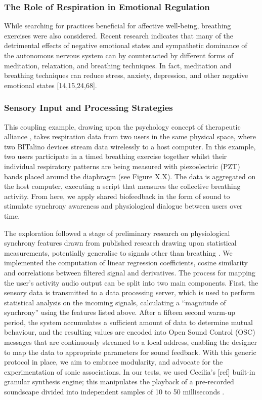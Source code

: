 \subsubsection{The Role of Respiration in Emotional Regulation}

While searching for practices beneficial for affective well-being, breathing exercises were also considered. Recent research indicates that many of the detrimental effects of negative emotional states and sympathetic dominance of the autonomous nervous system can by counteracted by different forms of meditation, relaxation, and breathing techniques. In fact, meditation and breathing techniques can reduce stress, anxiety, depression, and other negative emotional states [14,15,24,68].

\subsubsection{Sensory Input and Processing Strategies}

This coupling example, drawing upon the psychology concept of therapeutic alliance \cite{koole_synchrony_2016}, takes respiration data from two users in the same physical space, where two BITalino devices stream data wirelessly to a host computer. In this example, two users participate in a timed breathing exercise together whilst their individual respiratory patterns are being measured with piezoelectric (PZT) bands placed around the diaphragm (see Figure X.X). The data is aggregated on the host computer, executing a script that measures the collective breathing activity. From here, we apply shared biofeedback in the form of sound to stimulate synchrony awareness and physiological dialogue between users over time.

The exploration followed a stage of preliminary research on physiological synchrony features drawn from published research drawing upon statistical measurements, potentially generalise to signals other than breathing \cite{zamm_endogenous_2016}. We implemented the computation of linear regression coefficients, cosine similarity and correlations between filtered signal and derivatives. The process for mapping the user’s activity audio output can be split into two main components. First, the sensory data is transmitted to a data processing server, which is used to perform statistical analysis on the incoming signals, calculating a “magnitude of synchrony” using the features listed above. After a fifteen second warm-up period, the system accumulates a sufficient amount of data to determine mutual behaviour, and the resulting values are encoded into Open Sound Control (OSC) messages that are continuously streamed to a local address, enabling the designer to map the data to appropriate parameters for sound feedback. With this generic protocol in place, we aim to embrace modularity, and advocate for the experimentation of sonic associations. In our tests, we used Cecilia’s [ref] built-in granular synthesis engine; this manipulates the playback of a pre-recorded soundscape divided into independent samples of 10 to 50 milliseconds \cite{roads_introduction_1988}.

